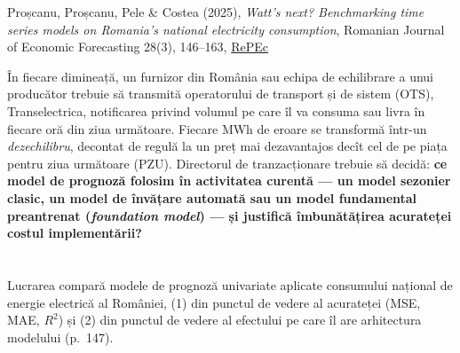 
\renewcommand{\emqacase}{\T{Research case 2 (Lecture 2)}{Studiul de caz 2 (cursul 2)}}

%
          { Proșcanu, Proșcanu, Pele \& Costea (2025), \emph{Watt's next? Benchmarking time series models on Romania's national electricity consumption},
           Romanian Journal of Economic Forecasting 28(3), 146--163, \href{https://EconPapers.repec.org/RePEc:rjr:romjef:v::y:2025:i:3:p:146-163}{RePEc}}

\begin{scenario}
%
{În fiecare dimineață, un furnizor din România sau echipa de echilibrare a unui producător trebuie să transmită operatorului de transport și de sistem (OTS), Transelectrica, notificarea privind volumul pe care îl va consuma sau livra în fiecare oră din ziua următoare.
Fiecare MWh de eroare se transformă într-un \emph{dezechilibru}, decontat de regulă la un preț mai dezavantajos decît cel de pe piața pentru ziua următoare (PZU).
Directorul de tranzacționare trebuie să decidă: \textbf{ce model de prognoză folosim în activitatea curentă --- un model sezonier clasic, un model de învățare automată sau un model fundamental preantrenat (\emph{foundation model}) --- și justifică îmbunătățirea acurateței costul implementării?}}
\end{scenario}

\section{}
\textbf{} %
{Lucrarea compară modele de prognoză univariate aplicate consumului național de energie electrică al României, (1) din punctul de vedere al acurateței (MSE, MAE, $R^2$) și (2) din punctul de vedere al efectului pe care îl are arhitectura modelului (p.~147).}

